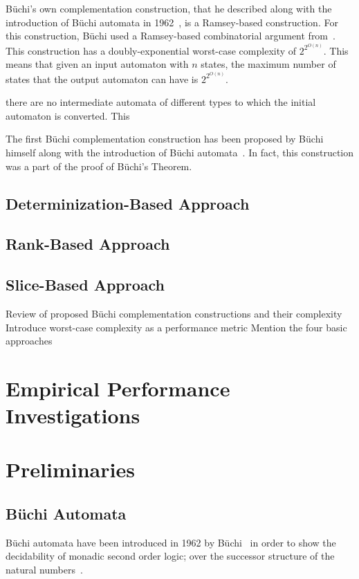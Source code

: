 Büchi's own complementation construction, that he described along with the introduction of Büchi automata in 1962~\cite{buchi1960decision}, is a Ramsey-based construction. For this construction, Büchi used a Ramsey-based combinatorial argument from~\cite{1930ramsey}. This construction has a doubly-exponential worst-case complexity of $2^{2^{O\left(n\right)}}$. This means that given an input automaton with $n$ states, the maximum number of states that the output automaton can have is $2^{2^{O\left(n\right)}}$.




 there are no intermediate automata of different types to which the initial automaton is converted. This



The first Büchi complementation construction has been proposed by Büchi himself along with the introduction of Büchi automata~\cite{buchi1960decision}. In fact, this construction was a part of the proof of Büchi's Theorem. 


\subsection{Determinization-Based Approach}

\subsection{Rank-Based Approach}

\subsection{Slice-Based Approach}


Review of proposed Büchi complementation constructions and their complexity
Introduce worst-case complexity as a performance metric
Mention the four basic approaches


\section{Empirical Performance Investigations}



\section{Preliminaries}
\subsection{Büchi Automata}
Büchi automata have been introduced in 1962 by Büchi~\cite{buchi1960decision} in order to show the decidability of monadic second order logic; over the successor structure of the natural numbers~\cite{2012_breuers}.

